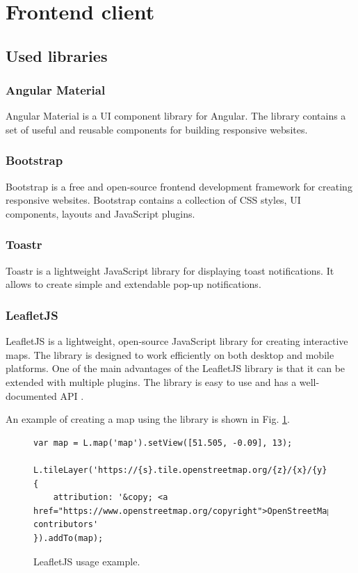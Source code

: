 \documentclass[a4paper,twoside,12pt]{book}
\begin{document}
\section{Frontend client}

\subsection{Used libraries}

\subsubsection{Angular Material}

Angular Material is a UI component library for Angular. The library contains a set of useful and reusable components for building responsive websites.

\subsubsection{Bootstrap}

Bootstrap is a free and open-source frontend development framework for creating responsive websites. Bootstrap contains a collection of CSS styles, UI components, layouts and JavaScript plugins. 

\subsubsection{Toastr}

Toastr is a lightweight JavaScript library for displaying toast notifications. It allows to create simple and extendable pop-up notifications.

\subsubsection{LeafletJS}

LeafletJS is a lightweight, open-source JavaScript library for creating interactive maps. The library is designed to work efficiently on both desktop and mobile platforms. One of the main advantages of the LeafletJS library is that it can be extended with multiple plugins. The library is easy to use and has a well-documented API \cite{bib:leaflet}. 

An example of creating a map using the library is shown in Fig. \ref{fig:leafletMap}.

\begin{figure}[H]
\centering
\begin{lstlisting}
var map = L.map('map').setView([51.505, -0.09], 13);

L.tileLayer('https://{s}.tile.openstreetmap.org/{z}/{x}/{y}.png', {
    attribution: '&copy; <a href="https://www.openstreetmap.org/copyright">OpenStreetMap</a> contributors'
}).addTo(map);
\end{lstlisting}
\caption{LeafletJS usage example.}
\label{fig:leafletMap}
\end{figure}
\end{document}
